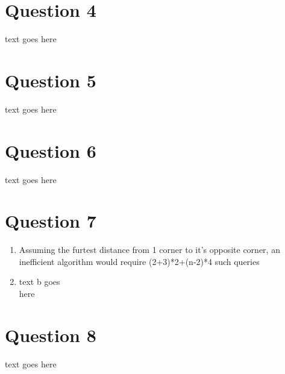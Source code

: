 \documentclass{article}
\begin{document}
\section*{Question 4}
text goes here

\section*{Question 5}
text goes here

\section*{Question 6}
text goes here

\section*{Question 7}
\begin{enumerate}[label=\alph*)]
    \item Assuming the furtest distance from 1 corner to it's opposite corner, an inefficient algorithm would require (2+3)*2+(n-2)*4 such queries
    \item text b goes\\
        here
\end{enumerate}

\section*{Question 8}
text goes here
\end{document}
